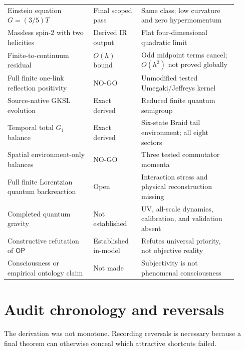 \documentclass[11pt]{article}
\theoremstyle{definition}
\theoremstyle{remark}
\newcommand{\OPT}{\mathsf{OP}}
\begin{document}
\begin{longtable}{>{\raggedright\arraybackslash}p{0.34\linewidth} >{\raggedright\arraybackslash}p{0.19\linewidth} >{\raggedright\arraybackslash}p{0.38\linewidth}}
Einstein equation $G=(3/5)T$ & Final scoped pass & Same class; low curvature and zero hypermomentum \\
Massless spin-2 with two helicities & Derived IR output & Flat four-dimensional quadratic limit \\
Finite-to-continuum residual & $O(h)$ bound & Odd midpoint terms cancel; $O(h^2)$ not proved globally \\
Full finite one-link reflection positivity & NO-GO & Unmodified tested Umegaki/Jeffreys kernel \\
Source-native GKSL evolution & Exact derived & Reduced finite quantum semigroup \\
Temporal total $G_1$ balance & Exact derived & Six-state Braid tail environment; all eight sectors \\
Spatial environment-only balances & NO-GO & Three tested commutator momenta \\
Full finite Lorentzian quantum backreaction & Open & Interaction stress and physical reconstruction missing \\
Completed quantum gravity & Not established & UV, all-scale dynamics, calibration, and validation absent \\
Constructive refutation of $\OPT$ & Established in-model & Refutes universal priority, not objective reality \\
Consciousness or empirical ontology claim & Not made & Subjectivity is not phenomenal consciousness \\
\bottomrule
\end{longtable}

\section{Audit chronology and reversals}

The derivation was not monotone. Recording reversals is necessary because a final theorem can otherwise conceal which attractive shortcuts failed.
\end{document}

